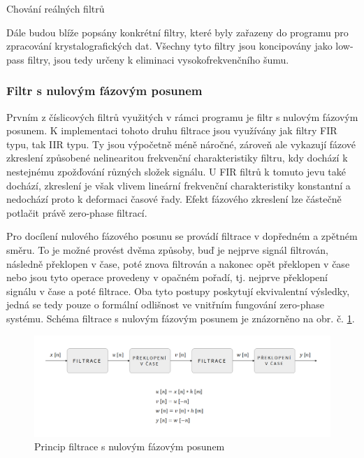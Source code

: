 \documentclass[a4paper, 12pt]{article}
\begin{document}
Chování reálných filtrů 


\noindent Dále budou blíže popsány konkrétní filtry, které byly zařazeny do programu pro zpracování krystalografických dat. Všechny tyto filtry jsou koncipovány jako low-pass filtry, jsou tedy určeny k eliminaci vysokofrekvenčního šumu.
\newpage
\subsubsection{Filtr s nulovým fázovým posunem}
\label{sec:filtr1}
Prvním z číslicových filtrů využitých v rámci programu je filtr s nulovým fázovým posunem. K implementaci tohoto druhu filtrace jsou využívány jak filtry FIR typu, tak IIR typu. Ty jsou výpočetně méně náročné, zároveň ale vykazují fázové zkreslení způsobené nelinearitou frekvenční charakteristiky filtru, kdy dochází k nestejnému zpožďování různých složek signálu. U FIR filtrů k tomuto jevu také dochází, zkreslení je však vlivem lineární frekvenční charakteristiky konstantní a nedochází proto k deformaci časové řady. Efekt fázového zkreslení lze částečně potlačit právě zero-phase filtrací. 

Pro docílení nulového fázového posunu se provádí filtrace v dopředném a zpětném směru. To je možné provést dvěma způsoby, buď je nejprve signál filtrován, následně překlopen v čase, poté znova filtrován a nakonec opět překlopen v čase nebo jsou tyto operace provedeny v opačném pořadí, tj. nejprve překlopení signálu v čase a poté filtrace. Oba tyto postupy poskytují ekvivalentní výsledky, jedná se tedy pouze o formální odlišnost ve vnitřním fungování zero-phase systému. Schéma filtrace s nulovým fázovým posunem je znázorněno na obr. č. \ref{fig:zerophase}.
\begin{figure}[hbt!]
  \centering
  \includegraphics[width=\linewidth]{zero-phase_moje.png}
  \caption{Princip filtrace s nulovým fázovým posunem}
  \label{fig:zerophase}
\end{figure}
\end{document}
